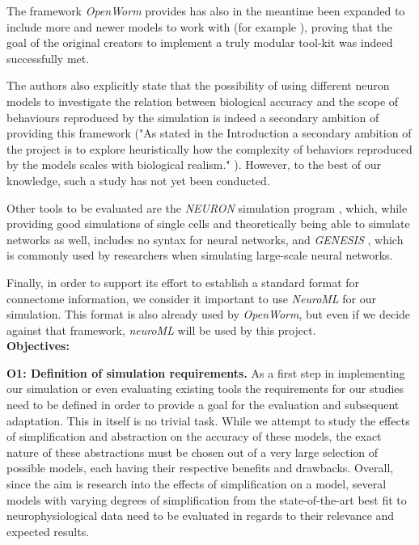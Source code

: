 \documentclass[a4paper,11pt]{article}
\begin{document}
The framework \emph{OpenWorm} provides has also in the meantime been expanded to include more and newer models to work with (for example \citep{M.2013}), proving that the goal of the original creators to implement a truly modular tool-kit was indeed successfully met.

The authors also explicitly state that the possibility of using different neuron models to investigate the relation between biological accuracy and the scope of behaviours reproduced by the simulation is indeed a secondary ambition of providing this framework ("As stated in the Introduction a secondary ambition of the project is to explore heuristically how the complexity of behaviors reproduced by the models scales with biological realism."  \citet{Szigeti2014}). However, to the best of our knowledge, such a study has not yet been conducted.

Other tools to be evaluated are the \emph{NEURON} simulation program \citep{Hines1994}, which, while providing good simulations of single cells and theoretically being able to simulate networks as well, includes no syntax for neural networks, and \emph{GENESIS} \citep{Bower2003}, which is commonly used by researchers when simulating large-scale neural networks. 

Finally, in order to support its effort to establish a standard format for connectome information, we consider it important to use \emph{NeuroML} \citep{Gleeson2010} for our simulation. This format is also already used by \emph{OpenWorm}, but even if we decide against that framework, \emph{neuroML} will be used by this project.
\\[0,2cm]

\textbf{Objectives:}

\textbf{O1: Definition of simulation requirements.}
As a first step in implementing our simulation or even evaluating existing tools the requirements for our studies need to be defined in order to provide a goal for the evaluation and subsequent adaptation. This in itself is no trivial task. While we attempt to study the effects of simplification and abstraction on the accuracy of these models, the exact nature of these abstractions must be chosen out of a very large selection of possible models, each having their respective benefits and drawbacks. 
Overall, since the aim is research into the effects of simplification on a model, several models with varying degrees of simplification from the state-of-the-art best fit to neurophysiological data need to be evaluated in regards to their relevance and expected results.
\end{document}
